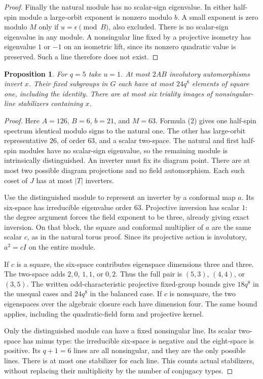 \documentclass[11pt,a4paper]{article}
\newtheorem{proposition}[lemma]{Proposition}
\begin{document}
\begin{proof}
Finally the natural module has no scalar-sign eigenvalue. In either
half-spin module a large-orbit exponent is nonzero modulo $b$.
A small exponent is zero modulo $M$ only if $u=\epsilon\pmod B$,
also excluded. There is no scalar-sign eigenvalue in any module.
A nonsingular line fixed by a projective isometry has eigenvalue
$1$ or $-1$ on an isometric lift, since its nonzero quadratic value
is preserved. Such a line therefore does not exist.
\end{proof}

\begin{proposition}\label{five}
For $q=5$ take $u=1$. At most $2AB$ involutory automorphisms invert
$x$. Their fixed subgroups in $G$ each have at most $24q^8$ elements
of square one, including the identity. There are at most six triality
images of nonsingular-line stabilizers containing $x$.
\end{proposition}
\begin{proof}
Here $A=126$, $B=6$, $b=21$, and $M=63$.
Formula (2) gives one half-spin spectrum identical modulo signs to
the natural one. The other has large-orbit representative $26$, of
order $63$, and a scalar two-space. The natural and first half-spin
modules have no scalar-sign eigenvalue, so the remaining module is
intrinsically distinguished. An inverter must fix its diagram point.
There are at most two possible diagram projections and no field
automorphism. Each such coset of $J$ has at most $|T|$ inverters.

Use the distinguished module to represent an inverter by a conformal
map $a$. Its six-space has irreducible eigenvalue order $63$.
Projective inversion has scalar $1$: the degree argument forces
the field exponent to be three, already giving exact inversion.
On that block, the square and conformal multiplier of $a$ are the
same scalar $c$, as in the natural torus proof. Since its projective
action is involutory, $a^2=cI$ on the entire module.

If $c$ is a square, the six-space contributes eigenspace dimensions
three and three. The two-space adds $2,0$, $1,1$, or $0,2$.
Thus the full pair is $(5,3)$, $(4,4)$, or $(3,5)$.
The written odd-characteristic projective fixed-group bounds give
$18q^8$ in the unequal cases and $24q^8$ in the balanced case.
If $c$ is nonsquare, the two eigenspaces over the algebraic closure
each have dimension four. The same bound applies, including the
quadratic-field form and projective kernel.

Only the distinguished module can have a fixed nonsingular line.
Its scalar two-space has minus type: the irreducible six-space is
negative and the eight-space is positive. Its $q+1=6$ lines are all
nonsingular, and they are the only possible lines. There is at most
one stabilizer for each line. This counts actual stabilizers, without
replacing their multiplicity by the number of conjugacy types.
\end{proof}
\end{document}
